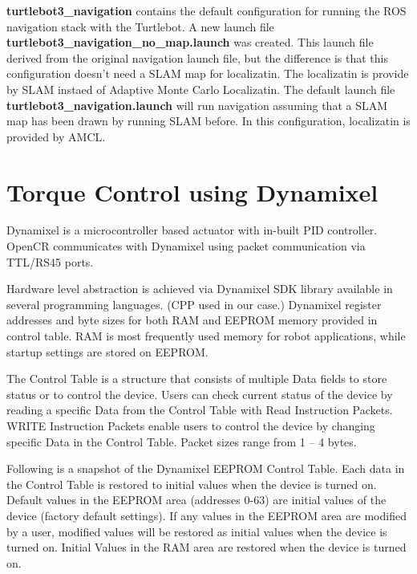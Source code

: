 \documentclass[12]{article}
\begin{document}
\textbf{turtlebot3\_navigation} contains the default configuration for running the ROS navigation stack with the Turtlebot.
A new launch file \textbf{turtlebot3\_navigation\_no\_map.launch} was created. This launch file derived from the original navigation launch file, but the difference is that this configuration doesn't need a SLAM map for localizatin. 
The localizatin is provide by SLAM instaed of Adaptive Monte Carlo Localizatin. The default launch file \textbf{turtlebot3\_navigation.launch} will run navigation assuming that a SLAM map has been drawn by running SLAM before. In this configuration, 
localizatin is provided by AMCL. 


\section{Torque Control using Dynamixel}
       
Dynamixel is a microcontroller based actuator with in-built PID controller. OpenCR communicates with Dynamixel using packet communication via TTL/RS45 ports. 

Hardware level abstraction is achieved via Dynamixel SDK library available in several programming languages. (CPP used in our case.)
Dynamixel register addresses and byte sizes for both RAM and EEPROM memory provided in control table. RAM is most frequently used memory for robot applications, while startup settings are stored on EEPROM.

The Control Table is a structure that consists of multiple Data fields to store status or to control the device. Users can check current status of the device by reading a specific Data from the Control Table with Read Instruction Packets. WRITE Instruction Packets enable users to control the device by changing specific Data in the Control Table. Packet sizes range from 1 – 4 bytes.

Following is a snapshot of the Dynamixel EEPROM Control Table. Each data in the Control Table is restored to initial values when the device is turned on. Default values in the EEPROM area (addresses 0-63) are initial values of the device (factory default settings). If any values in the EEPROM area are modified by a user, modified values will be restored as initial values when the device is turned on. Initial Values in the RAM area are restored when the device is turned on.
\end{document}
